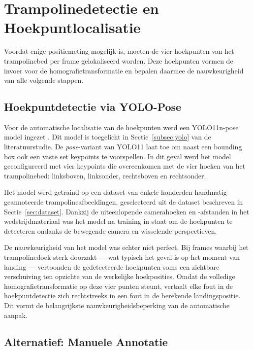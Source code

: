 
\section{Trampolinedetectie en Hoekpuntlocalisatie}
\label{sec:trampolinedetectie}

Voordat enige positiemeting mogelijk is, moeten de vier hoekpunten van het trampolinebed per frame gelokaliseerd worden. Deze hoekpunten vormen de invoer voor de homografietransformatie en bepalen daarmee de nauwkeurigheid van alle volgende stappen.

\subsection{Hoekpuntdetectie via YOLO-Pose}
\label{subsec:hoekpuntdetectie}

Voor de automatische localisatie van de hoekpunten werd een YOLO11n-pose model ingezet \autocite{Jocher_Ultralytics_YOLO_2023}. Dit model is toegelicht in Sectie~\ref{subsec:yolo} van de literatuurstudie. De \textit{pose}-variant van YOLO11 laat toe om naast een bounding box ook een vaste set keypoints te voorspellen. In dit geval werd het model geconfigureerd met vier keypoints die overeenkomen met de vier hoeken van het trampolinebed: linksboven, linksonder, rechtsboven en rechtsonder.

Het model werd getraind op een dataset van enkele honderden handmatig geannoteerde trampolineafbeeldingen, geselecteerd uit de dataset beschreven in Sectie~\ref{sec:dataset}. Dankzij de uiteenlopende camerahoeken en -afstanden in het wedstrijdmateriaal was het model na training in staat om de hoekpunten te detecteren ondanks de bewegende camera en wisselende perspectieven.

De nauwkeurigheid van het model was echter niet perfect. Bij frames waarbij het trampolinedoek sterk doorzakt — wat typisch het geval is op het moment van landing — vertoonden de gedetecteerde hoekpunten soms een zichtbare verschuiving ten opzichte van de werkelijke hoekposities. Omdat de volledige homografietransformatie op deze vier punten steunt, vertaalt elke fout in de hoekpuntdetectie zich rechtstreeks in een fout in de berekende landingspositie. Dit vormt de belangrijkste nauwkeurigheidsbeperking van de automatische aanpak.

\subsection{Alternatief: Manuele Annotatie}
\label{subsec:manuele-annotatie}

